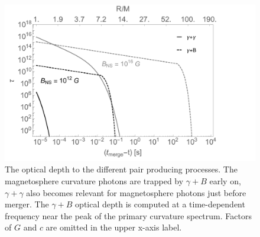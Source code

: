 \begin{figure}
\begin{center} \vspace{-20pt}
\includegraphics[scale=0.38]{figures/ch7/tauGB_and_tauGG_vs_t.pdf}
\end{center}
\caption{The optical depth to the different pair producing
  processes. The magnetosphere curvature photons are trapped by
  $\gamma + B$ early on, $\gamma + \gamma$ also becomes relevant for
  magnetosphere photons just before merger. The $\gamma+B$ optical
  depth is computed at a time-dependent frequency near the peak of the
  primary curvature spectrum. Factors of $G$ and $c$ are omitted in
  the upper x-axis label.}
\label{Fig:tauComp}
\end{figure}






